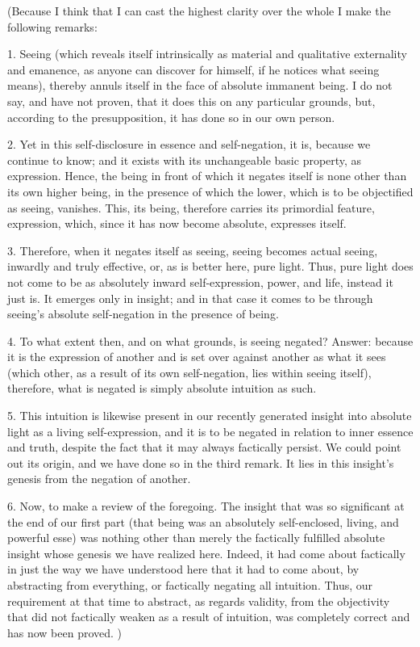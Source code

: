 (Because I think that I can cast
the highest clarity over the whole
I make the following remarks:

1. Seeing
(which reveals itself intrinsically
as material and qualitative externality and emanence,
as anyone can discover for himself,
if he notices what seeing means),
thereby annuls itself in the face
of absolute immanent being.
I do not say, and have not proven,
that it does this on any particular grounds,
but, according to the presupposition,
it has done so in our own person.

2.  Yet in this self-disclosure
in essence and self-negation,
it is, because we continue to know;
and it exists with its unchangeable basic property,
as expression.
Hence, the being in front of which
it negates itself is none other
than its own higher being,
in the presence of which the lower,
which is to be objectified as seeing, vanishes.
This, its being, therefore carries its
primordial feature, expression,
which, since it has now become absolute,
expresses itself.

3. Therefore, when it negates itself as seeing,
seeing becomes actual seeing,
inwardly and truly effective,
or, as is better here, pure light.
Thus, pure light does not come to be as
absolutely inward self-expression, power, and life,
instead it just is.
It emerges only in insight;
and in that case it comes to be
through seeing’s absolute self-negation
in the presence of being.

4. To what extent then,
and on what grounds,
is seeing negated?
Answer: because it is the expression of another
and is set over against another as what it sees
(which other, as a result of its own self-negation,
lies within seeing itself),
therefore, what is negated
is simply absolute intuition as such.

5. This intuition is likewise present
in our recently generated insight into
absolute light as a living self-expression,
and it is to be negated in relation to
inner essence and truth,
despite the fact that it may
always factically persist.
We could point out its origin,
and we have done so in the third remark.
It lies in this insight’s genesis
from the negation of another.

6. Now, to make a review of the foregoing.
The insight that was so significant
at the end of our first part
(that being was an absolutely
self-enclosed, living, and powerful esse)
was nothing other than merely
the factically fulfilled absolute insight
whose genesis we have realized here.
Indeed, it had come about factically
in just the way we have understood
here that it had to come about,
by abstracting from everything,
or factically negating all intuition.
Thus, our requirement at that time to abstract,
as regards validity, from the objectivity
that did not factically weaken as a result of intuition,
was completely correct and has now been proved.
)

